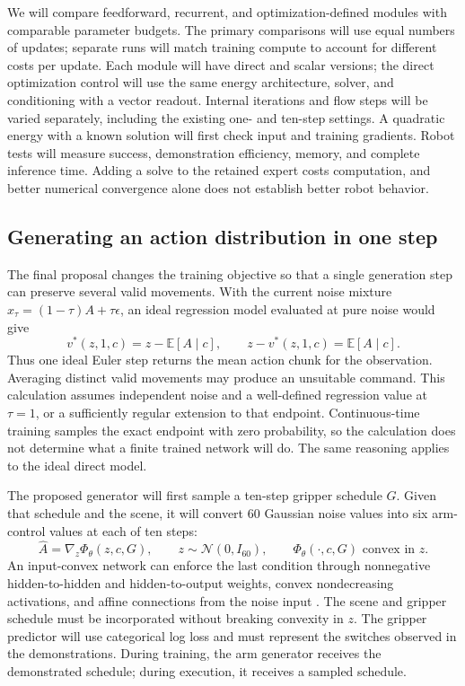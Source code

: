 We will compare feedforward, recurrent, and optimization-defined modules with comparable parameter budgets. The primary comparisons will use equal numbers of updates; separate runs will match training compute to account for different costs per update. Each module will have direct and scalar versions; the direct optimization control will use the same energy architecture, solver, and conditioning with a vector readout. Internal iterations and flow steps will be varied separately, including the existing one- and ten-step settings. A quadratic energy with a known solution will first check input and training gradients. Robot tests will measure success, demonstration efficiency, memory, and complete inference time. Adding a solve to the retained expert costs computation, and better numerical convergence alone does not establish better robot behavior.

\subsection{Generating an action distribution in one step}
\label{sec:convex}
The final proposal changes the training objective so that a single generation step can preserve several valid movements. With the current noise mixture $x_\tau=(1-\tau)A+\tau\epsilon$, an ideal regression model evaluated at pure noise would give
\begin{equation}
v^*(z,1,c)=z-\mathbb E[A\mid c],\qquad z-v^*(z,1,c)=\mathbb E[A\mid c].
\end{equation}
Thus one ideal Euler step returns the mean action chunk for the observation. Averaging distinct valid movements may produce an unsuitable command. This calculation assumes independent noise and a well-defined regression value at $\tau=1$, or a sufficiently regular extension to that endpoint. Continuous-time training samples the exact endpoint with zero probability, so the calculation does not determine what a finite trained network will do. The same reasoning applies to the ideal direct model.

The proposed generator will first sample a ten-step gripper schedule $G$. Given that schedule and the scene, it will convert 60 Gaussian noise values into six arm-control values at each of ten steps:
\begin{equation}
\widehat A=\nabla_z\Phi_\theta(z,c,G),\qquad z\sim\mathcal N(0,I_{60}),\qquad
\Phi_\theta(\cdot,c,G)\text{ convex in }z.
\end{equation}
An input-convex network can enforce the last condition through nonnegative hidden-to-hidden and hidden-to-output weights, convex nondecreasing activations, and affine connections from the noise input \cite{icnn}. The scene and gripper schedule must be incorporated without breaking convexity in $z$. The gripper predictor will use categorical log loss and must represent the switches observed in the demonstrations. During training, the arm generator receives the demonstrated schedule; during execution, it receives a sampled schedule.

